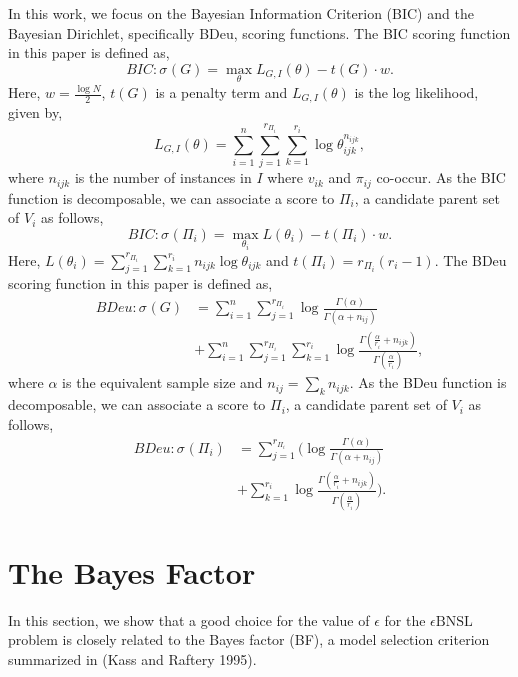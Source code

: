 \documentclass[letterpaper]{article}
\newcommand{\graph}{\mathit{G}}
\newcommand{\vertex}[1]{V_{#1}}
\newcommand{\problem}{\mathit{\epsilon}\text{BNSL}}
\newcommand{\score}[2]{\sigma_{#1}({#2})}
\begin{document}
In this work, we focus on the Bayesian Information Criterion (BIC) and the Bayesian Dirichlet, specifically BDeu, scoring functions. The BIC scoring function in this paper is defined as,
\begin{equation*}
BIC : \score{}{\graph} = \max_{\theta} L_{G,I} (\theta) - t({G})\cdot w.
\end{equation*}
Here, $w = \frac{\log N}{2}$, $t(G)$ is a penalty term and $L_{G,I} (\theta)$ is the log likelihood, given by,
\begin{equation*}
L_{G,I} (\theta) = \displaystyle  \sum_{i=1}^n \sum_{j=1}^{r_{\Pi_i}} \sum_{k=1}^{r_i} \log \theta_{ijk}^{n_{ijk}} ,
\end{equation*}
where $n_{ijk}$ is the number of instances in $I$ where $v_{ik}$ and $\pi_{ij}$ co-occur.
As the BIC function is decomposable, we can associate a score to $\Pi_i$, a candidate parent set of $\vertex{i}$ as follows,
\begin{equation*}
BIC : \score{}{\Pi_i} = \max_{\theta_i} L(\theta_i) - t({\Pi_i})\cdot w.
\end{equation*}
Here, $L (\theta_i) =\sum_{j=1}^{r_{\Pi_i}}\sum_{k=1}^{r_i} n_{ijk} \log \theta_{ijk}$ and $t(\Pi_i) = r_{\Pi_i}(r_i -1)$.
The BDeu scoring function in this paper is defined as,
\begin{align*}
BDeu : \score{}{G} &= \displaystyle  \sum_{i=1}^n \sum_{j=1}^{r_{\Pi_i}} \log \frac{\Gamma (\alpha)}{ \Gamma(\alpha + n_{ij})} \\&+  \sum_{i=1}^n \sum_{j=1}^{r_{\Pi_i}} \sum_{k=1}^{r_i} \log \frac{\Gamma (\frac{\alpha}{r_i}+ n_{ijk})}{\Gamma(\frac{\alpha}{r_i})},
\end{align*}
where $\alpha$ is the equivalent sample size and $n_{ij} = \sum_k n_{ijk}$.
As the BDeu function is decomposable, we can associate a score to $\Pi_i$, a candidate parent set of $\vertex{i}$ as follows,
\begin{align*}
BDeu : \score{}{\Pi_i} &= \displaystyle  \sum_{j=1}^{r_{\Pi_i}} \Bigg(\log \frac{\Gamma (\alpha)}{ \Gamma(\alpha + n_{ij})} \\&+ \sum_{k=1}^{r_i} \log \frac{\Gamma (\frac{\alpha}{r_i}+ n_{ijk})}{\Gamma(\frac{\alpha}{r_i})} \Bigg).
\end{align*}

\section{The Bayes Factor}\label{sec:bf}

In this section, we show that a good choice for the value of $\epsilon$ for the
$\problem$ problem is closely related to the
Bayes factor (BF), a model selection criterion summarized in (Kass and Raftery 1995).
\end{document}

